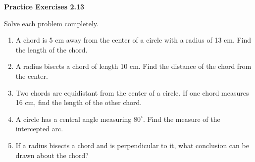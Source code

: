\vspace{0.3ex}
\noindent\textbf{Practice Exercises 2.13}

\vspace{0.2ex}

Solve each problem completely.
\begin{enumerate}
    \item A chord is 5 cm away from the center of a circle with a radius of 13 cm. Find the length of the chord.
    \item A radius bisects a chord of length 10 cm. Find the distance of the chord from the center.
    \item Two chords are equidistant from the center of a circle. If one chord measures 16 cm, find the length of the other chord.
    \item A circle has a central angle measuring $80^\circ$. Find the measure of the intercepted arc.
    \item If a radius bisects a chord and is perpendicular to it, what conclusion can be drawn about the chord?
\end{enumerate}
